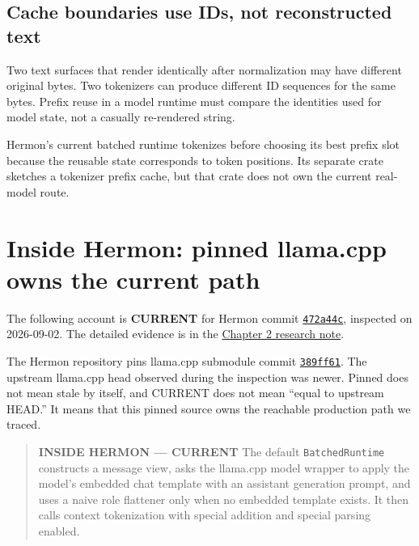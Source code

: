 \subsection{Cache boundaries use IDs, not reconstructed
text}\label{cache-boundaries-use-ids-not-reconstructed-text}

Two text surfaces that render identically after normalization may have
different original bytes. Two tokenizers can produce different ID
sequences for the same bytes. Prefix reuse in a model runtime must
compare the identities used for model state, not a casually re-rendered
string.

Hermon's current batched runtime tokenizes before choosing its best
prefix slot because the reusable state corresponds to token positions.
Its separate \texttt{} crate sketches a
tokenizer prefix cache, but that crate does not own the current
real-model route.

\section{Inside Hermon: pinned llama.cpp owns the current
path}\label{inside-hermon-pinned-llama.cpp-owns-the-current-path}

The following account is \textbf{CURRENT} for Hermon commit
\href{https://github.com/hermonai/hermon/commit/472a44cdb511b2dae6c9569e59543db8f8350b25}{\texttt{472a44c}},
inspected on 2026-09-02. The detailed evidence is in the
\href{https://github.com/hermonai/inside-the-llm-engine/blob/astra-visual-rewrite/research/part-01/chapter-02-from-text-to-tokens.md}{Chapter
2 research note}.

The Hermon repository pins llama.cpp submodule commit
\href{https://github.com/ggml-org/llama.cpp/commit/389ff61d77b5c71cec0cf92fe4e5d01ace80b797}{\texttt{389ff61}}.
The upstream llama.cpp head observed during the inspection was newer.
Pinned does not mean stale by itself, and CURRENT does not mean ``equal
to upstream HEAD.'' It means that this pinned source owns the reachable
production path we traced.

\begin{quote}
\textbf{INSIDE HERMON --- CURRENT} The default \texttt{BatchedRuntime}
constructs a message view, asks the llama.cpp model wrapper to apply the
model's embedded chat template with an assistant generation prompt, and
uses a naive role flattener only when no embedded template exists. It
then calls context tokenization with special addition and special
parsing enabled.
\end{quote}

